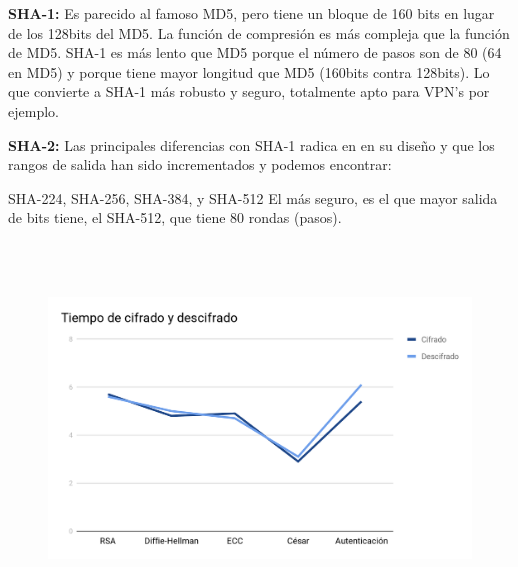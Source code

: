 \documentclass[12pt]{article}
\begin{document}
\vspace{\baselineskip}
\begin{justify}
\textbf{SHA-1:} Es parecido al famoso MD5, pero tiene un bloque de 160 bits en lugar de los 128bits del MD5. La función de compresión es más compleja que la función de MD5. SHA-1 es más lento que MD5 porque el número de pasos son de 80 (64 en MD5) y porque tiene mayor longitud que MD5 (160bits contra 128bits). Lo que convierte a SHA-1 más robusto y seguro, totalmente apto para VPN’s por ejemplo.
\end{justify}\par


\vspace{\baselineskip}
\begin{justify}
\textbf{SHA-2:} Las principales diferencias con SHA-1 radica en en su diseño y que los rangos de salida han sido incrementados y podemos encontrar:
\end{justify}\par


\vspace{\baselineskip}
\begin{FlushLeft}
SHA-224, SHA-256, SHA-384, y SHA-512 El más seguro, es el que mayor salida de bits tiene, el SHA-512, que tiene 80 rondas (pasos).
\end{FlushLeft}\par


\vspace{\baselineskip}

\vspace{\baselineskip}



\begin{figure}[H]
	\begin{Center}
		\includegraphics[width=6.27in,height=3.88in]{./media/image1.png}
	\end{Center}
\end{figure}



\par


\printbibliography
\end{document}

